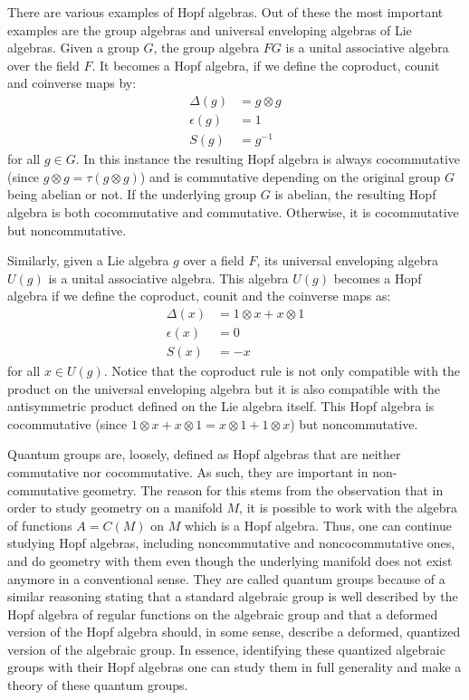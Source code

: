 There are various examples of Hopf algebras. Out of these the most important examples
are the group algebras and universal enveloping algebras of Lie algebras. Given a
group $G$, the group algebra $FG$ is a unital associative algebra over the field $F$.
It becomes a Hopf algebra, if we define the coproduct, counit and coinverse maps by:
\begin{align}
\Delta(g) & = g \otimes g \\
\epsilon(g) & = 1 \\
S(g) & = g^{-1}
\end{align}
for all $g \in G$. In this instance the resulting Hopf algebra is always
cocommutative  (since $g \otimes g = \tau(g \otimes g)$) and is
commutative depending on the original group $G$ being abelian or not. If the
underlying group $G$ is abelian, the resulting Hopf algebra is both cocommutative
and commutative. Otherwise, it is cocommutative but noncommutative.

Similarly, given a Lie algebra $g$ over a field $F$, its universal enveloping algebra
$U(g)$ is a unital associative algebra. This algebra $U(g)$ becomes a Hopf algebra
if we define the coproduct, counit and the coinverse maps as:
\begin{align}
\Delta(x) & = 1 \otimes x + x \otimes 1 \\
\epsilon(x) & = 0 \\
S(x) & = -x
\end{align}
for all $x \in U(g)$. Notice that the coproduct rule is not only compatible with the
product on the universal enveloping algebra but it is also compatible with the
antisymmetric product defined on the Lie algebra itself. This Hopf algebra is
cocommutative (since $1 \otimes x + x \otimes 1 = x \otimes 1 + 1 \otimes x$) but noncommutative.

Quantum groups are, loosely, defined as Hopf algebras that are neither commutative nor
cocommutative. As such, they are important in non-commutative geometry. The reason for
this stems from the observation that in order to study geometry on a manifold $M$,
it is possible to work with the algebra of functions $A = C(M)$ on $M$ which is a Hopf
algebra. Thus, one can continue studying Hopf algebras, including noncommutative
and noncocommutative ones, and do geometry with them even though the underlying manifold
does not exist anymore in a conventional sense. They are called quantum groups because of
a similar reasoning stating that a standard algebraic group is well described by the
Hopf algebra of regular functions on the algebraic group and that a deformed version
of the Hopf algebra should, in some sense, describe a deformed, quantized version of the
algebraic group. In essence, identifying these quantized algebraic groups with their
Hopf algebras one can study them in full generality and make a theory of these quantum
groups.

